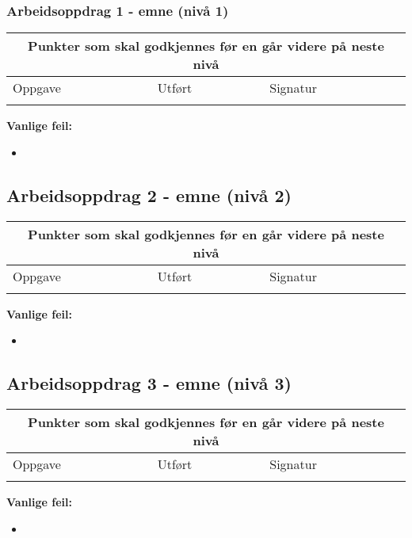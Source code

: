 \subsubsection*{Arbeidsoppdrag 1 -  emne (nivå 1)}

\begin{center} \begin{tabular}{ | m{8cm} | m{1cm}| m{2cm} | } 
\hline
\multicolumn{3}{|c|}{Punkter som skal godkjennes før en går videre på neste nivå} \\
	\hline
	Oppgave	& Utført & Signatur \\ 
	\hline
& & \\ 
	\hline
\end{tabular}
\end{center}

\textbf{Vanlige feil:}
\begin{itemize}[noitemsep]
	\item 
\end{itemize}
\newpage
\subsection*{Arbeidsoppdrag 2 - emne (nivå 2)}

\begin{center}
\begin{tabular}{ | m{8cm} | m{1cm}| m{2cm} | } 
\hline
\multicolumn{3}{|c|}{Punkter som skal godkjennes før en går videre på neste nivå} \\
	\hline
	Oppgave	& Utført & Signatur \\ 
	\hline
& & \\ 
	\hline
\end{tabular}
\end{center}
\textbf{Vanlige feil:}
\begin{itemize}[noitemsep]
	\item 
\end{itemize}
\newpage
\subsection*{Arbeidsoppdrag 3 - emne (nivå 3)}

\begin{center}
\begin{tabular}{ | m{8cm} | m{1cm}| m{2cm} | } 
\hline
\multicolumn{3}{|c|}{Punkter som skal godkjennes før en går videre på neste nivå} \\
	\hline
	Oppgave	& Utført & Signatur \\ 
	\hline
& & \\ 
	\hline
\end{tabular}
\end{center}
\textbf{Vanlige feil:}
\begin{itemize}[noitemsep]
	\item 
\end{itemize}
\newpage

